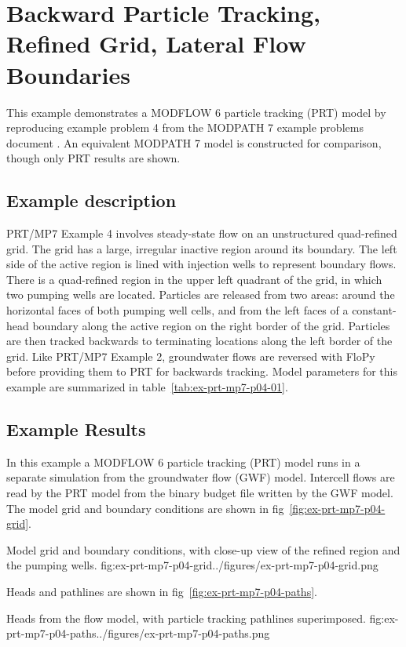 \section{Backward Particle Tracking, Refined Grid, Lateral Flow Boundaries}

This example demonstrates a MODFLOW 6 particle tracking (PRT) model by reproducing example problem 4 from the MODPATH 7 \citep{pollock2016modpath7} example problems document \citep{modpath7examples}. An equivalent MODPATH 7 model is constructed for comparison, though only PRT results are shown.

\subsection{Example description}

PRT/MP7 Example 4 involves steady-state flow on an unstructured quad-refined grid. The grid has a large, irregular inactive region around its boundary. The left side of the active region is lined with injection wells to represent boundary flows. There is a quad-refined region in the upper left quadrant of the grid, in which two pumping wells are located. Particles are released from two areas: around the horizontal faces of both pumping well cells, and from the left faces of a constant-head boundary along the active region on the right border of the grid. Particles are then tracked backwards to terminating locations along the left border of the grid. Like PRT/MP7 Example 2, groundwater flows are reversed with FloPy before providing them to PRT for backwards tracking. Model parameters for this example are summarized in table~\ref{tab:ex-prt-mp7-p04-01}.



\subsection{Example Results}

In this example a MODFLOW 6 particle tracking (PRT) model runs in a separate simulation from the groundwater flow (GWF) model. Intercell flows are read by the PRT model from the binary budget file written by the GWF model. The model grid and boundary conditions are shown in fig~\ref{fig:ex-prt-mp7-p04-grid}.

\begin{StandardFigure}{
    Model grid and boundary conditions, with close-up view of the refined region and the pumping wells.
    }{fig:ex-prt-mp7-p04-grid}{../figures/ex-prt-mp7-p04-grid.png}
\end{StandardFigure}

Heads and pathlines are shown in fig~\ref{fig:ex-prt-mp7-p04-paths}.

\begin{StandardFigure}{
    Heads from the flow model, with particle tracking pathlines superimposed.
    }{fig:ex-prt-mp7-p04-paths}{../figures/ex-prt-mp7-p04-paths.png}
\end{StandardFigure}